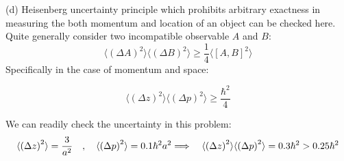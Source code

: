 \begin{homeworkProblem}
\begin{homeworkSection}{(d)}
Heisenberg uncertainty principle which prohibits arbitrary exactness in measuring the both momentum and location of an object can be checked here. Quite generally consider two incompatible observable $A$ and $B$:
\begin{equation}
\langle\left(\Delta A\right)^2\rangle\langle\left(\Delta B\right)^2\rangle\ge \frac{1}{4}\langle\left[A,B\right]^2\rangle
\end{equation}
Specifically in the case of momentum and space:

\begin{equation}
\langle\left(\Delta z\right)^2\rangle\langle\left(\Delta p\right)^2\rangle\ge \frac{\hbar^2}{4}
\end{equation}

We can readily check the uncertainty in this problem:
\begin{equation}
\langle\left(\Delta z\right)^2\rangle=\frac{3}{a^2}\quad ,\quad \langle\left(\Delta p\right)^2\rangle=0.1\hbar^2 a^2\Longrightarrow\quad \langle\left(\Delta z\right)^2\rangle\langle\left(\Delta p\right)^2\rangle=0.3\hbar^2 > 0.25\hbar^2
\end{equation}





\end{homeworkSection}


\end{homeworkProblem}